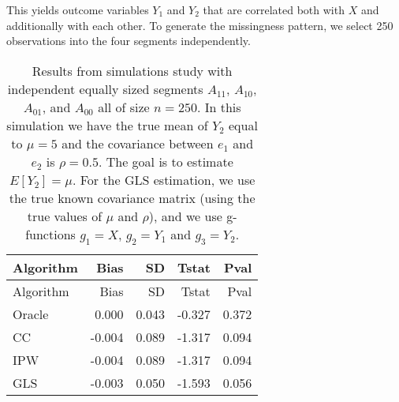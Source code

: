 \documentclass[
  letterpaper,
  DIV=11,
  numbers=noendperiod]{scrartcl}
\begin{document}
This yields outcome variables \(Y_1\) and \(Y_2\) that are correlated
both with \(X\) and additionally with each other. To generate the
missingness pattern, we select 250 observations into the four segments
independently.

\begin{longtable}[]{@{}lrrrr@{}}
\caption{Results from simulations study with independent equally sized
segments \(A_{11}\), \(A_{10}\), \(A_{01}\), and \(A_{00}\) all of size
\(n = 250\). In this simulation we have the true mean of \(Y_2\) equal
to \(\mu = 5\) and the covariance between \(e_1\) and \(e_2\) is
\(\rho = 0.5\). The goal is to estimate \(E[Y_2] = \mu\). For the GLS
estimation, we use the true known covariance matrix (using the true
values of \(\mu\) and \(\rho\)), and we use g-functions \(g_1 = X\),
\(g_2 = Y_1\) and \(g_3 = Y_2\). }\tabularnewline
\toprule\noalign{}
Algorithm & Bias & SD & Tstat & Pval \\
\midrule\noalign{}
\endfirsthead
\toprule\noalign{}
Algorithm & Bias & SD & Tstat & Pval \\
\midrule\noalign{}
\endhead
\bottomrule\noalign{}
\endlastfoot
Oracle & 0.000 & 0.043 & -0.327 & 0.372 \\
CC & -0.004 & 0.089 & -1.317 & 0.094 \\
IPW & -0.004 & 0.089 & -1.317 & 0.094 \\
GLS & -0.003 & 0.050 & -1.593 & 0.056 \\
\end{longtable}
\end{document}
